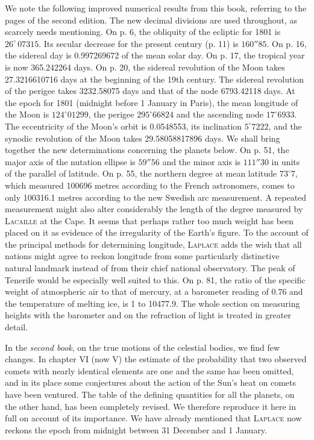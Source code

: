 We note the following improved numerical results from this book, referring to the pages of the second edition. The new decimal divisions are used throughout, as scarcely needs mentioning. On p. 6, the obliquity of the ecliptic for 1801 is $26^{\circ}\,07315$. Its secular decrease for the present century (p. 11) is $160''85$. On p. 16, the sidereal day is 0.997269672 of the mean solar day. On p. 17, the tropical year is now 365.242264 days. On p. 20, the sidereal revolution of the Moon takes 27.3216610716 days at the beginning of the 19th century. The sidereal revolution of the perigee takes 3232.58075
 days and that of the node 6793.42118 days. At the epoch for 1801 (midnight before 1 January in Paris), the mean longitude of the Moon is $124^{\circ}01299$, the perigee $295^{\circ}66824$ and the ascending node $17^{\circ}6933$. The eccentricity of the Moon’s orbit is 0.0548553, its inclination $5^{\circ}7222$, and the synodic revolution of the Moon takes 29.58058817896 days. We shall bring together the new determinations concerning the planets below. On p. 51, the major axis of the nutation ellipse is $59''56$ and the minor axis is $111''30$ in units of the parallel of latitude. On p. 55, the northern degree at mean latitude $73^{\circ}7$, which measured 100696 metres according to the French astronomers, comes to only 100316.1 metres according to the new Swedish arc measurement. A repeated measurement might also alter considerably the length of the degree measured by \textsc{Lacaille} at the Cape. It seems that perhaps rather too much weight has been placed on it as evidence of the irregularity of the Earth’s figure. To the account of the principal methods for determining longitude, \textsc{Laplace} adds the wish that all nations might agree to reckon longitude from some particularly distinctive natural landmark instead of from their chief national observatory. The peak of Tenerife would be especially well suited to this. On p. 81, the ratio of the specific weight of atmospheric air to that of mercury, at a barometer reading of 0.76 and the temperature of melting ice, is 1 to 10477.9. The whole section on measuring heights with the barometer and on the refraction of light is treated in greater detail.

In the \emph{second book}, on the true motions of the celestial bodies, we find few changes. In chapter VI (now V) the estimate of the probability that two observed comets with nearly identical elements are one and the same has been omitted, and in its place some conjectures about the action of the Sun’s heat on comets have been ventured. The table of the defining quantities for all the planets, on the other hand, has been completely revised. We therefore reproduce it here in full on account of its importance. We have already mentioned that \textsc{Laplace} now reckons the epoch from midnight between 31 December and 1 January.


